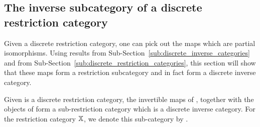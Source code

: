 \subsection{The inverse subcategory of a discrete restriction category } %
\label{sub:the_inverse_subcategory_of_a_discrete_restriction_category}

Given a discrete restriction category, one can pick out the maps which are partial isomorphisms.
Using results from Sub-Section~\ref{sub:discrete_inverse_categories} and from
Sub-Section~\ref{sub:discrete_restriction_categories},
this section will show that these maps form a restriction subcategory and in fact form a discrete
inverse category.

\begin{proposition}\label{lem:inv_x_is_a_discrete_inverse_category}
  Given \X is a discrete restriction category, the invertible maps of \X, together with the objects
  of \X form a sub-restriction category which is a discrete inverse category. For the restriction
  category $\mathbb{X}$, we denote this sub-category by \Invc{\X}.
\end{proposition}

